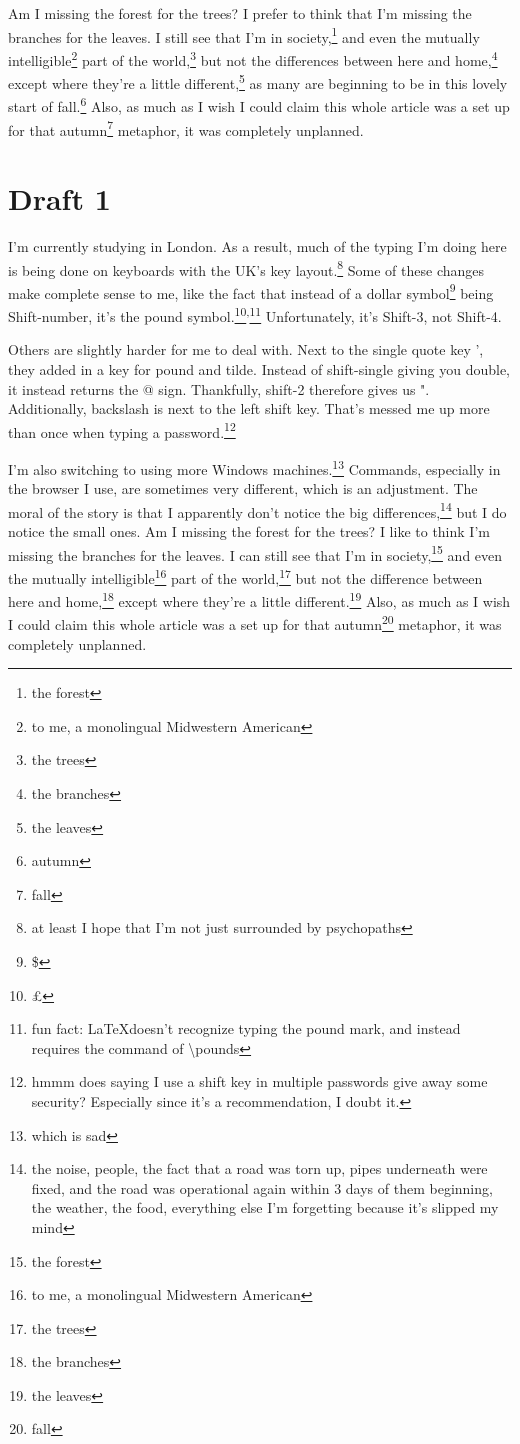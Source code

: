 \documentclass[12pt]{article}[titlepage]
\newcommand{\1}{\={a}}
\newcommand{\2}{\={e}}
\newcommand{\3}{\={\i}}
\newcommand{\4}{\=o}
\newcommand{\5}{\=u}
\newcommand{\6}{\={A}}
\renewcommand{\,}{\textsuperscript{,}}
\begin{document}
Am I missing the forest for the trees?
I prefer to think that I'm missing the branches for the leaves.
I still see that I'm in society,\footnote{the forest} and even the mutually intelligible\footnote{to me, a monolingual Midwestern American} part of the world,\footnote{the trees} but not the differences between here and home,\footnote{the branches} except where they're a little different,\footnote{the leaves} as many are beginning to be in this lovely start of fall.\footnote{autumn}
Also, as much as I wish I could claim this whole article was a set up for that autumn\footnote{fall} metaphor, it was completely unplanned.
\section{Draft 1}
I'm currently studying in London.
As a result, much of the typing I'm doing here is being done on keyboards with the UK's key layout.\footnote{at least I hope that I'm not just surrounded by psychopaths}
Some of these changes make complete sense to me, like the fact that instead of a dollar symbol\footnote{\$} being Shift-number, it's the pound symbol.\footnote{\pounds}\,\footnote{fun fact: \LaTeX doesn't recognize typing the pound mark, and instead requires the command of \textbackslash{}pounds}
Unfortunately, it's Shift-3, not Shift-4.

Others are slightly harder for me to deal with.
Next to the single quote key ', they added in a key for pound and tilde.
Instead of shift-single giving you double, it instead returns the @ sign.
Thankfully, shift-2 therefore gives us ".
Additionally, backslash is next to the left shift key.
That's messed me up more than once when typing a password.\footnote{hmmm does saying I use a shift key in multiple passwords give away some security? Especially since it's a recommendation, I doubt it.}

I'm also switching to using more Windows machines.\footnote{which is sad}
Commands, especially in the browser I use, are sometimes very different, which is an adjustment.
The moral of the story is that I apparently don't notice the big differences,\footnote{the noise, people, the fact that a road was torn up, pipes underneath were fixed, and the road was operational again within 3 days of them beginning, the weather, the food, everything else I'm forgetting because it's slipped my mind} but I do notice the small ones.
Am I missing the forest for the trees?
I like to think I'm missing the branches for the leaves.
I can still see that I'm in society,\footnote{the forest} and even the mutually intelligible\footnote{to me, a monolingual Midwestern American} part of the world,\footnote{the trees} but not the difference between here and home,\footnote{the branches} except where they're a little different.\footnote{the leaves}
Also, as much as I wish I could claim this whole article was a set up for that autumn\footnote{fall} metaphor, it was completely unplanned.
\end{document}
